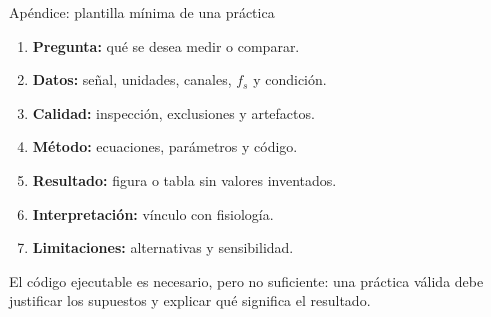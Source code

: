 \documentclass[
  ignorenonframetext,
  aspectratio=169,
  spanish,
  professionalfonts]{beamer}
\providecommand{\tightlist}{%
  \setlength{\itemsep}{0pt}\setlength{\parskip}{0pt}}
\begin{document}
\begin{frame}{Apéndice: plantilla mínima de una práctica}
\protect{}\label{apuxe9ndice-plantilla-muxednima-de-una-pruxe1ctica}
\begin{enumerate}
\tightlist
\item
  \textbf{Pregunta:} qué se desea medir o comparar.
\item
  \textbf{Datos:} señal, unidades, canales, \(f_s\) y condición.
\item
  \textbf{Calidad:} inspección, exclusiones y artefactos.
\item
  \textbf{Método:} ecuaciones, parámetros y código.
\item
  \textbf{Resultado:} figura o tabla sin valores inventados.
\item
  \textbf{Interpretación:} vínculo con fisiología.
\item
  \textbf{Limitaciones:} alternativas y sensibilidad.
\end{enumerate}

\begin{tcolorbox}[enhanced jigsaw, arc=.35mm, bottomrule=.15mm, bottomtitle=1mm, breakable, colback=white, colbacktitle=quarto-callout-important-color!10!white, colframe=quarto-callout-important-color-frame, coltitle=black, left=2mm, leftrule=.75mm, opacityback=0, opacitybacktitle=0.6, rightrule=.15mm, title={Estándar esperado}, titlerule=0mm, toprule=.15mm, toptitle=1mm]

El código ejecutable es necesario, pero no suficiente: una práctica
válida debe justificar los supuestos y explicar qué significa el
resultado.

\end{tcolorbox}
\end{frame}
\end{document}

